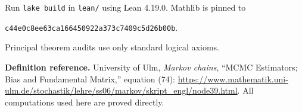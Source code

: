 \documentclass[11pt]{article}
\begin{document}
Run \texttt{lake build} in \texttt{lean/} using Lean 4.19.0. Mathlib is pinned to
\begin{center}\small\texttt{c44e0c8ee63ca166450922a373c7409c5d26b00b}.\end{center}
Principal theorem audits use only standard logical axioms.

\smallskip\noindent\small\textbf{Definition reference.} University of Ulm, \emph{Markov chains}, ``MCMC Estimators; Bias and Fundamental Matrix,'' equation (74): \url{https://www.mathematik.uni-ulm.de/stochastik/lehre/ss06/markov/skript_engl/node39.html}. All computations used here are proved directly.
\end{document}

